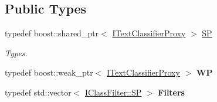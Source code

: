 \subsection*{Public Types}
\begin{DoxyCompactItemize}
\item 
\mbox{\label{class_i_text_classifier_proxy_aa56fb825a9d4dc045a2ffb2c2ea7d7af}} 
typedef boost\+::shared\+\_\+ptr$<$ \hyperlink{class_i_text_classifier_proxy}{I\+Text\+Classifier\+Proxy} $>$ \hyperlink{class_i_text_classifier_proxy_aa56fb825a9d4dc045a2ffb2c2ea7d7af}{SP}
\begin{DoxyCompactList}\small\item\em Types. \end{DoxyCompactList}\item 
\mbox{\label{class_i_text_classifier_proxy_a67b07e221bf6509c2502489baea8aece}} 
typedef boost\+::weak\+\_\+ptr$<$ \hyperlink{class_i_text_classifier_proxy}{I\+Text\+Classifier\+Proxy} $>$ {\bfseries WP}
\item 
\mbox{\label{class_i_text_classifier_proxy_ae517be3c581b0190cbdd775314778224}} 
typedef std\+::vector$<$ \hyperlink{class_i_text_classifier_proxy_1_1_i_class_filter_a357b80113ef82baf44162575250c4d75}{I\+Class\+Filter\+::\+SP} $>$ {\bfseries Filters}
\end{DoxyCompactItemize}
